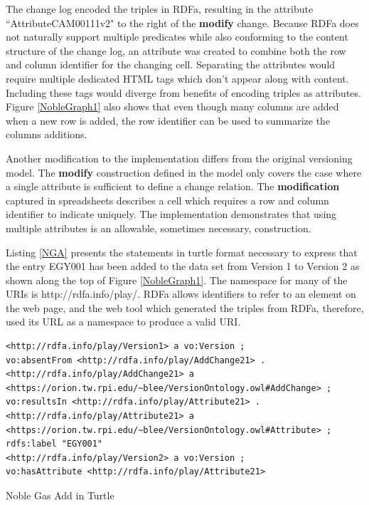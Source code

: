 The change log encoded the triples in RDFa, resulting in the attribute ``AttributeCAM00111v2" to the right of the \textbf{modify} change.
Because RDFa does not naturally support multiple predicates while also conforming to the content structure of the change log, an attribute was created to combine both the row and column identifier for the changing cell.
Separating the attributes would require multiple dedicated HTML tags which don't appear along with content.
Including these tags would diverge from benefits of encoding triples as attributes.
Figure \ref{NobleGraph1} also shows that even though many columns are added when a new row is added, the row identifier can be used to summarize the columns additions.

Another modification to the implementation differs from the original versioning model.
The \textbf{modify} construction defined in the model only covers the case where a single attribute is sufficient to define a change relation.
The \textbf{modification} captured in spreadsheets describes a cell which requires a row and column identifier to indicate uniquely.
The implementation demonstrates that using multiple attributes is an allowable, sometimes necessary, construction.

Listing \ref{NGA} presents the statements in turtle format necessary to express that the entry EGY001 has been added to the data set from Version 1 to Version 2 as shown along the top of Figure \ref{NobleGraph1}.
The namespace for many of the URIs is \textlangle http://rdfa.info/play/\textrangle.
RDFa allows identifiers to refer to an element on the web page, and the web tool which generated the triples from RDFa, therefore, used its URL as a namespace to produce a valid URI.


\begin{listing}
	\begin{verbatim}
<http://rdfa.info/play/Version1> a vo:Version ;
vo:absentFrom <http://rdfa.info/play/AddChange21> .
<http://rdfa.info/play/AddChange21> a <https://orion.tw.rpi.edu/~blee/VersionOntology.owl#AddChange> ;
vo:resultsIn <http://rdfa.info/play/Attribute21> .
<http://rdfa.info/play/Attribute21> a <https://orion.tw.rpi.edu/~blee/VersionOntology.owl#Attribute> ;
rdfs:label "EGY001"
<http://rdfa.info/play/Version2> a vo:Version ;
vo:hasAttribute <http://rdfa.info/play/Attribute21>
	\end{verbatim}
	\caption{Noble Gas Add in Turtle}
	\label{NGA}
\end{listing}

